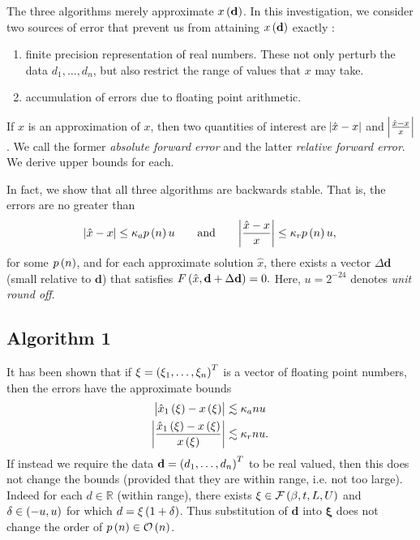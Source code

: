 \documentclass[12pt]{article}
\theoremstyle{definition}
\begin{document}
The three algorithms merely approximate $x\del{\mathbf{d}}$. In this investigation, we consider two sources of error that prevent us from attaining $x\del{\mathbf{d}}$ exactly \cite{lec2}:
\begin{enumerate}
\item finite precision representation of real numbers. These not only perturb the data $d_1,\dots,d_n$, but also restrict the range of values that $x$ may take.
\item accumulation of errors due to floating point arithmetic.
\end{enumerate}
If $\hat{x}$ is an approximation of $x$, then two quantities of interest are $\abs{\hat{x} - x}$ and $\abs{\frac{\hat{x}-x}{x}}$. We call the former \textit{absolute forward error} and the latter \textit{relative forward error}. We derive upper bounds for each.

In fact, we show that all three algorithms are backwards stable. That is, the errors are no greater than
\begin{align*}
\abs{\hat{x}-x} \leq \kappa_a p\del{n} u \qquad \text{and} \qquad
\abs{\frac{\hat{x}-x}{x}} \leq \kappa_r p\del{n} u,
\end{align*}
for some $p\del{n}$, and for each approximate solution $\hat{x}$, there exists a vector $\Delta \mathbf{d}$ (small relative to $\mathbf{d}$) that satisfies $F\del{\hat{x},\mathbf{d}+\Delta\mathbf{d}}=0.$ Here, $u = 2^{-24}$ denotes \textit{unit round off}.

\subsection{Algorithm 1}
It has been shown \cite{lec3} that if $\mathbf{\xi} = \del{\xi_1,\dots,\xi_n}^T$ is a vector of floating point numbers, then the errors have the approximate bounds
\begin{align*}
\abs{\hat{x}_1\del{\xi}-x\del{\xi}} &\lesssim  \kappa_a n u\\
\abs{\frac{\hat{x}_1\del{\xi}-x\del{\xi}}{x\del{\xi}}} &\lesssim  \kappa_r n u.
\end{align*}
If instead we require the data $\mathbf{d} = \del{d_1,\dots,d_n}^T$ to be real valued, then this does not change the bounds (provided that they are within range, i.e. not too large). Indeed for each $d \in \mathbb{R}$ (within range), there exists $\xi \in \mathcal{F}\del{\beta,t,L,U}$ and $\delta \in \del{-u,u}$ for which $d = \xi\del{1 + \delta}$. Thus substitution of $\mathbf{d}$ into $\mathbf{\xi}$ does not change the order of $p\del{n} \in \mathcal{O}\del{n}$. 
\end{document}
